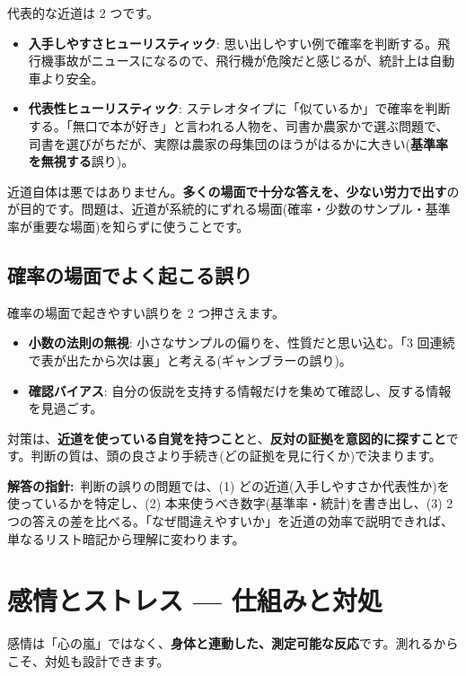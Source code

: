 \documentclass{article}
\begin{document}
代表的な近道は 2 つです。

\begin{itemize}
\item \textbf{入手しやすさヒューリスティック}: 思い出しやすい例で確率を判断する。飛行機事故がニュースになるので、飛行機が危険だと感じるが、統計上は自動車より安全。
\item \textbf{代表性ヒューリスティック}: ステレオタイプに「似ているか」で確率を判断する。「無口で本が好き」と言われる人物を、司書か農家かで選ぶ問題で、司書を選びがちだが、実際は農家の母集団のほうがはるかに大きい(\textbf{基準率を無視する}誤り)。
\end{itemize}

近道自体は悪ではありません。\textbf{多くの場面で十分な答えを、少ない労力で出す}のが目的です。問題は、近道が系統的にずれる場面(確率・少数のサンプル・基準率が重要な場面)を知らずに使うことです。

\subsection{確率の場面でよく起こる誤り}

確率の場面で起きやすい誤りを 2 つ押さえます。

\begin{itemize}
\item \textbf{小数の法則の無視}: 小さなサンプルの偏りを、性質だと思い込む。「3 回連続で表が出たから次は裏」と考える(ギャンブラーの誤り)。
\item \textbf{確認バイアス}: 自分の仮説を支持する情報だけを集めて確認し、反する情報を見過ごす。
\end{itemize}

対策は、\textbf{近道を使っている自覚を持つこと}と、\textbf{反対の証拠を意図的に探すこと}です。判断の質は、頭の良さより手続き(どの証拠を見に行くか)で決まります。

\textbf{解答の指針:}\ 判断の誤りの問題では、(1) どの近道(入手しやすさか代表性か)を使っているかを特定し、(2) 本来使うべき数字(基準率・統計)を書き出し、(3) 2 つの答えの差を比べる。「なぜ間違えやすいか」を近道の効率で説明できれば、単なるリスト暗記から理解に変わります。

\section{感情とストレス — 仕組みと対処}

感情は「心の嵐」ではなく、\textbf{身体と連動した、測定可能な反応}です。測れるからこそ、対処も設計できます。
\end{document}
